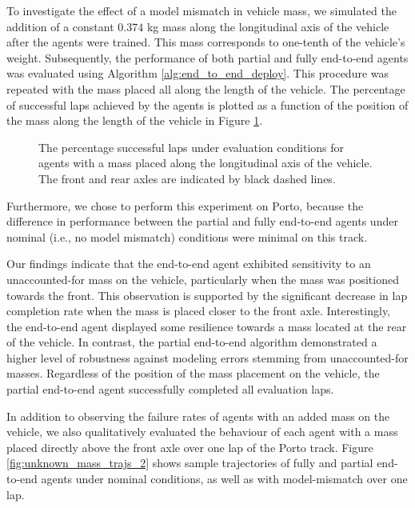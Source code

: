 To investigate the effect of a model mismatch in vehicle mass, we simulated the addition of a constant $0.374$ kg mass along the longitudinal axis of the vehicle after the agents were trained.
This mass corresponds to one-tenth of the vehicle's weight. 
Subsequently, the performance of both partial and fully end-to-end agents was evaluated using Algorithm \ref{alg:end_to_end_deploy}. 
This procedure was repeated with the mass placed all along the length of the vehicle.
The percentage of successful laps achieved by the agents is plotted as a function of the position of the mass along the length of the vehicle in Figure \ref{fig:unknown_mass}.
\begin{figure}[htb!]
    \centering
    
    \caption[Percentage successful laps under evaluation conditions for agents with a mass placed along the longitudinal axis of the vehicle]{The percentage successful laps under evaluation conditions for agents with a mass placed along the longitudinal axis of the vehicle. The front and rear axles are indicated by black dashed lines.}
    \label{fig:unknown_mass}
\end{figure}
Furthermore, we chose to perform this experiment on Porto, because the difference in performance between the partial and fully end-to-end agents under nominal (i.e., no model mismatch) conditions were minimal on this track.


Our findings indicate that the end-to-end agent exhibited sensitivity to an unaccounted-for mass on the vehicle, particularly when the mass was positioned towards the front. 
This observation is supported by the significant decrease in lap completion rate when the mass is placed closer to the front axle. 
Interestingly, the end-to-end agent displayed some resilience towards a mass located at the rear of the vehicle. 
In contrast, the partial end-to-end algorithm demonstrated a higher level of robustness against modeling errors stemming from unaccounted-for masses. 
Regardless of the position of the mass placement on the vehicle, the partial end-to-end agent successfully completed all evaluation laps.

In addition to observing the failure rates of agents with an added mass on the vehicle, we also qualitatively evaluated the behaviour of each agent with a mass placed directly above the front axle over one lap of the Porto track.
Figure \ref{fig:unknown_mass_trajs_2} shows sample trajectories of fully and partial end-to-end agents under nominal conditions, as well as with model-mismatch over one lap.

